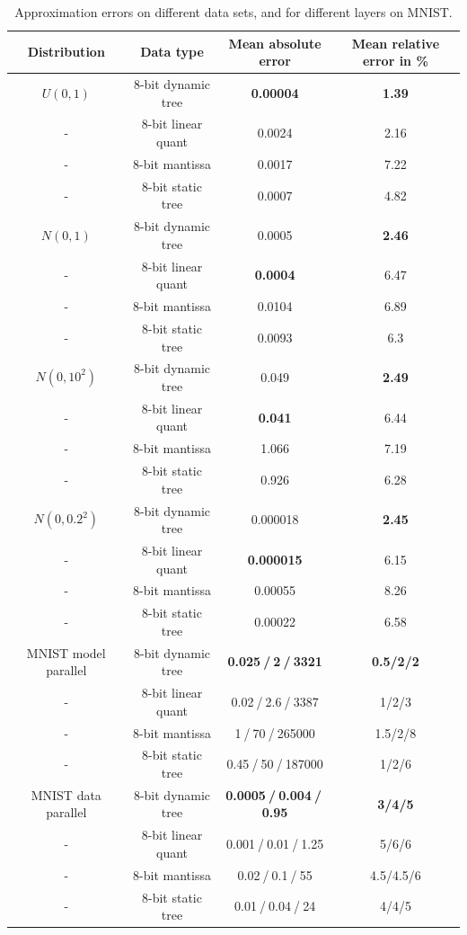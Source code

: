 \documentclass{article} %
\begin{document}
\begin{table}[h]
	\caption{Approximation errors on different data sets, and for different layers on MNIST.}
	\label{sample-table}
	\begin{minipage}
		{\linewidth}
		\centering
		\begin{tabular}{ cccc}
			\toprule[1.5pt]
			Distribution & Data type & Mean absolute error & Mean relative error in \%\\\midrule
			$U(0,1)$ & 8-bit dynamic tree & {\bf0.00004} & {\bf 1.39}  \\
			- & 8-bit linear quant & 0.0024 & 2.16\\
			- & 8-bit mantissa & 0.0017 & 7.22\\
			- & 8-bit static tree & 0.0007 & 4.82\\\midrule	
			$N(0,1)$ & 8-bit dynamic tree & 0.0005 & {\bf2.46}\\
			- & 8-bit linear quant &  {\bf0.0004} & 6.47 \\
			- & 8-bit mantissa & 0.0104 & 6.89 \\
			- & 8-bit static tree & 0.0093 & 6.3 \\\midrule
			$N(0,10^2)$ & 8-bit dynamic tree & 0.049 & {\bf2.49} \\
			- & 8-bit linear quant & {\bf0.041 }& 6.44 \\
			- & 8-bit mantissa & 1.066 & 7.19\\
			- & 8-bit static tree & 0.926 & 6.28 \\\midrule
			$N(0,0.2^2)$ & 8-bit dynamic tree & 0.000018 & {\bf2.45} \\
			- & 8-bit linear quant &{\bf 0.000015} & 6.15 \\
			- & 8-bit mantissa & 0.00055 & 8.26\\
			- & 8-bit static tree & 0.00022 & 6.58 \\\midrule
			MNIST model parallel & 8-bit dynamic tree & {\bf 0.025$\>$/$\>$2$\>$/$\>$3321 }& {\bf0.5/2/2} \\
			- & 8-bit linear quant & 0.02$\>$/$\>$2.6$\>$/$\>$3387 & 1/2/3 \\
			- & 8-bit mantissa & 1$\>$/$\>$70$\>$/$\>$265000  & 1.5/2/8\\
			- & 8-bit static tree & 0.45$\>$/$\>$50$\>$/$\>$187000 &  1/2/6 \\\midrule
			MNIST data parallel & 8-bit dynamic tree & {\bf 0.0005$\>$/$\>$0.004$\>$/$\>$0.95} &  {\bf3/4/5} \\
			- & 8-bit linear quant & 0.001$\>$/$\>$0.01$\>$/$\>$1.25 & 5/6/6 \\
			- & 8-bit mantissa & 0.02$\>$/$\>$0.1$\>$/$\>$55 & 4.5/4.5/6\\
			- & 8-bit static tree & 0.01$\>$/$\>$0.04$\>$/$\>$24&  4/4/5\\
			\bottomrule[1.25pt]
		\end{tabular}
		\par
		\bigskip
	\end{minipage}
\end{table}
\end{document}
